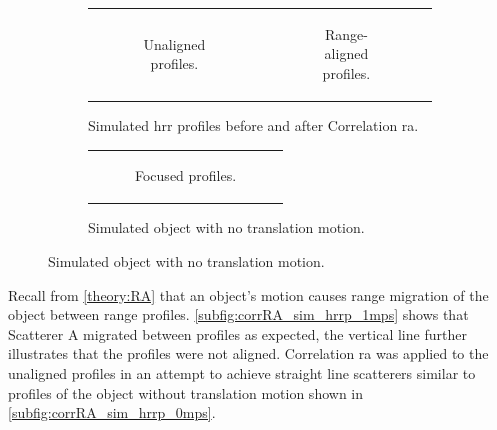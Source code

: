 \documentclass[class=report,11pt,crop=false]{standalone}
\begin{document}
    \begin{figure}[H]
        \begin{minipage}{0.60\linewidth}
            \begin{figure}
                \begin{tabular}{@{}cc@{}}
                    \begin{subfigure}{0.5\linewidth}
                        \centering
                        \resizebox{\linewidth}{!}{}
                        \caption{Unaligned profiles.}\label{subfig:corrRA_sim_hrrp_1mps}
                    \end{subfigure}
                    &
                    \begin{subfigure}{0.5\linewidth}
                        \centering
                        \resizebox{\linewidth}{!}{}
                        \caption{Range-aligned profiles.}\label{subfig:corrRA_sim_hrrp}
                    \end{subfigure}
                \end{tabular}
                \caption{Simulated \gls{hrr} profiles before and after Correlation \gls{ra}. \label{fig:corrRA_sim}}
            \end{figure}
        \end{minipage}
        \hfill
        \begin{minipage}{0.30\linewidth}
            \begin{figure}
                \begin{tabular}{@{}c@{}}
                    \begin{subfigure}{\linewidth}
                        \centering
                        \resizebox{\linewidth}{!}{}
                        \caption{Focused profiles.\label{subfig:corrRA_sim_hrrp_0mps}}
                    \end{subfigure}
                \end{tabular}
                \caption{Simulated object with no translation motion.} \label{fig:sim_0mps}
            \end{figure}
        \end{minipage}
    \end{figure}
    
    Recall from \autoref{theory:RA} that an object's motion causes range migration of the object between range profiles. \autoref{subfig:corrRA_sim_hrrp_1mps} shows that Scatterer A migrated between profiles as expected, the vertical line further illustrates that the profiles were not aligned. Correlation \gls{ra} was applied to the unaligned profiles in an attempt to achieve straight line scatterers similar to profiles of the object without translation motion shown in \autoref{subfig:corrRA_sim_hrrp_0mps}.
\end{document}
